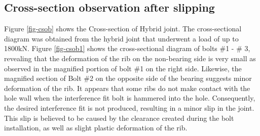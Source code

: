 \subsection{Cross-section observation after slipping}

Figure \ref{fig-csob} shows the Cross-section of Hybrid joint. The cross-sectional diagram was obtained from the hybrid joint that underwent a load of up to 1800kN. Figure \ref{fig-csob1} shows the cross-sectional diagram of bolts \#1 - \# 3, revealing that the deformation of the rib on the non-bearing side is very small as observed in the magnified portion of bolt \#1 on the right side. Likewise, the magnified section of Bolt \#2 on the opposite side of the bearing suggests minor deformation of the rib. It appears that some ribs do not make contact with the hole wall when the interference fit bolt is hammered into the hole. Consequently, the desired interference fit is not produced, resulting in a minor slip in the joint. This slip is believed to be caused by the clearance created during the bolt installation, as well as slight plastic deformation of the rib.

